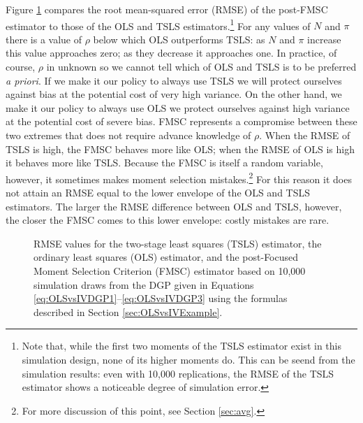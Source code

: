 Figure \ref{fig:OLSvsIV_RMSEbaseline} compares the root mean-squared error (RMSE) of the post-FMSC estimator to those of the OLS and TSLS estimators.\footnote{Note that, while the first two moments of the TSLS estimator exist in this simulation design, none of its higher moments do.
This can be seend from the simulation results: even with 10,000 replications, the RMSE of the TSLS estimator shows a noticeable degree of simulation error.}
For any values of $N$ and $\pi$ there is a value of $\rho$ below which OLS outperforms TSLS: as $N$ and $\pi$ increase this value approaches zero; as they decrease it approaches one.
In practice, of course, $\rho$ in unknown so we cannot tell which of OLS and TSLS is to be preferred \emph{a priori}.
If we make it our policy to always use TSLS we will protect ourselves against bias at the potential cost of very high variance.
On the other hand, we make it our policy to always use OLS we protect ourselves against high variance at the potential cost of severe bias. 
FMSC represents a compromise between these two extremes that does not require advance knowledge of $\rho$. 
When the RMSE of TSLS is high, the FMSC behaves more like OLS; when the RMSE of OLS is high it behaves more like TSLS.
Because the FMSC is itself a random variable, however, it sometimes makes moment selection mistakes.\footnote{For more discussion of this point, see Section \ref{sec:avg}.} 
For this reason it does not attain an RMSE equal to the lower envelope of the OLS and TSLS estimators.
The larger the RMSE difference between OLS and TSLS, however, the closer the FMSC comes to this lower envelope: costly mistakes are rare.


\begin{figure}
\centering
	
	\caption{RMSE values for the two-stage least squares (TSLS) estimator, the ordinary least squares (OLS) estimator, and the post-Focused Moment Selection Criterion (FMSC) estimator based on 10,000 simulation draws from the DGP given in Equations \ref{eq:OLSvsIVDGP1}--\ref{eq:OLSvsIVDGP3} using the formulas described in Section \ref{sec:OLSvsIVExample}.}
	\label{fig:OLSvsIV_RMSEbaseline}
\end{figure}

